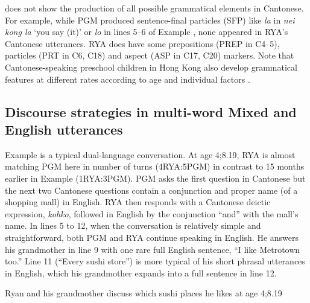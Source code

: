 \documentclass[output=paper,colorlinks,citecolor=brown]{langscibook}
\begin{document}
\largerpage
{} does not show the production of all possible grammatical elements in Cantonese. For example, while PGM produced sentence-final particles (SFP) like \textit{la} in \textit{nei kong la} ‘you say (it)’ or \textit{lo} in lines 5–6 of Example , none appeared in RYA’s Cantonese utterances. RYA does have some prepositions (PREP in C4–5), particles (PRT in C6, C18) and aspect (ASP in C17, C20) markers. Note that Cantonese-speaking preschool children in Hong Kong also develop grammatical features at different rates according to age and individual factors \citep{Wong2023}.


\subsection{ {Discourse} {strategies} {in} {multi-word} {Mixed} {and} {English} {utterances} }\label{sec:quay:5.3}

Example  is a typical dual-language conversation. At age 4;8.19, RYA is almost matching PGM here in number of turns (4RYA:5PGM) in contrast to 15 months earlier in Example  (1RYA:3PGM). PGM asks the first question in Cantonese but the next two Cantonese questions contain a conjunction and proper name (of a shopping mall) in English. RYA then responds with a Cantonese deictic expression, \textit{kohko}, followed in English by the conjunction “and” with the mall’s name. In lines 5 to 12, when the conversation is relatively simple and straightforward, both PGM and RYA continue speaking in English. He answers his grandmother in line 9 with one rare full English sentence, “I like Metrotown too.” Line 11 (“Every sushi store”) is more typical of his short phrasal utterances in English, which his grandmother expands into a full sentence in line 12.

\ea%
    \label{ex:quay:2}
         Ryan and his grandmother discuss which sushi places he likes at age 4;8.19 \\
\end{document}
